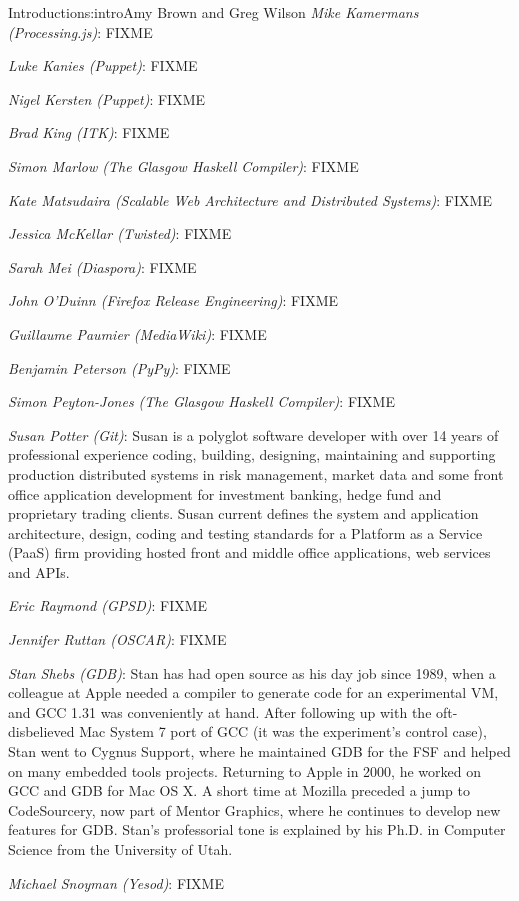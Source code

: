 \begin{aosachapter}{Introduction}{s:intro}{Amy Brown and Greg Wilson}
\emph{Mike Kamermans (Processing.js)}: FIXME

\emph{Luke Kanies (Puppet)}: FIXME

\emph{Nigel Kersten (Puppet)}: FIXME

\emph{Brad King (ITK)}: FIXME

\emph{Simon Marlow (The Glasgow Haskell Compiler)}: FIXME

\emph{Kate Matsudaira (Scalable Web Architecture and Distributed Systems)}: FIXME

\emph{Jessica McKellar (Twisted)}: FIXME

\emph{Sarah Mei (Diaspora)}: FIXME

\emph{John O'Duinn (Firefox Release Engineering)}: FIXME

\emph{Guillaume Paumier (MediaWiki)}: FIXME

\emph{Benjamin Peterson (PyPy)}: FIXME

\emph{Simon Peyton-Jones (The Glasgow Haskell Compiler)}: FIXME

\emph{Susan Potter (Git)}: Susan is a polyglot software developer with
over 14 years of professional experience coding, building, designing,
maintaining and supporting production distributed systems in risk management,
market data and some front office application development for investment
banking, hedge fund and proprietary trading clients. Susan current defines the
system and application architecture, design, coding and testing standards for
a Platform as a Service (PaaS) firm providing hosted front and middle office
applications, web services and APIs.

\emph{Eric Raymond (GPSD)}: FIXME

\emph{Jennifer Ruttan (OSCAR)}: FIXME

\emph{Stan Shebs (GDB)}: Stan has had open source as his day job since
1989, when a colleague at Apple needed a compiler to generate code for
an experimental VM, and GCC 1.31 was conveniently at hand.  After
following up with the oft-disbelieved Mac System 7 port of GCC (it was
the experiment's control case), Stan went to Cygnus Support, where he
maintained GDB for the FSF and helped on many embedded tools projects.
Returning to Apple in 2000, he worked on GCC and GDB for Mac OS X.  A
short time at Mozilla preceded a jump to CodeSourcery, now part of
Mentor Graphics, where he continues to develop new features for GDB.
Stan's professorial tone is explained by his Ph.D. in Computer Science
from the University of Utah.

\emph{Michael Snoyman (Yesod)}: FIXME


\end{aosachapter}
